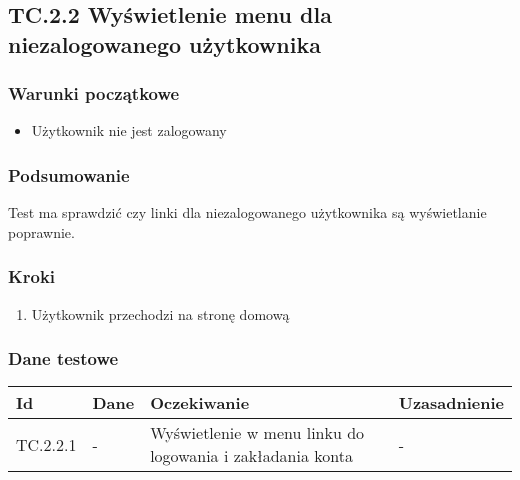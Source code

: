 \documentclass[a4paper,15pt]{article}
\begin{document}
\newpage
\begin{framed}
\subsection{TC.2.2 Wyświetlenie menu dla niezalogowanego użytkownika}

\vspace{0.5cm}

\subsubsection{Warunki początkowe}
\begin{itemize}
\item Użytkownik nie jest zalogowany
\end{itemize}

\subsubsection{Podsumowanie}
Test ma sprawdzić czy linki dla niezalogowanego użytkownika są wyświetlanie poprawnie.

\subsubsection{Kroki}
\begin{enumerate}
\item Użytkownik przechodzi na stronę domową
\end{enumerate}

\subsubsection{Dane testowe}

\begin{center}
\begin{tabular}{ |C{1.5cm}|C{3cm}|C{4cm}|C{4cm}| } 
 \hline
 \textbf{Id} & \textbf{Dane} & \textbf{Oczekiwanie} & \textbf{Uzasadnienie} \\ \hline
 TC.2.2.1 & - & Wyświetlenie w menu linku do logowania i zakładania konta & - \\ \hline
\end{tabular}
\end{center}

\end{framed}
\end{document}
